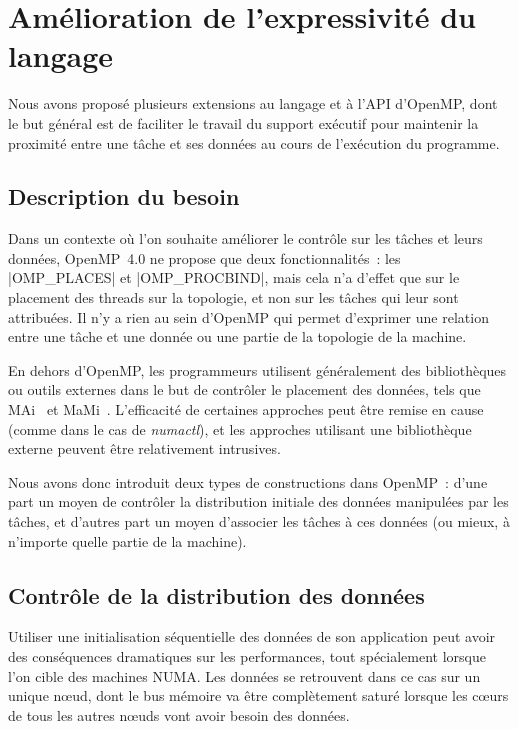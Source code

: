 \section{Amélioration de l'expressivité du langage}\label{sec:openmp:langage}

Nous avons proposé plusieurs extensions au langage et à l'API d'OpenMP, dont le but général est de faciliter le travail du support exécutif pour maintenir la proximité entre une tâche et ses données au cours de l'exécution du programme.

\subsection{Description du besoin}

Dans un contexte où l'on souhaite améliorer le contrôle sur les tâches et leurs données, OpenMP~4.0 ne propose que deux fonctionnalités~: les |OMP_PLACES| et |OMP_PROCBIND|, mais cela n'a d'effet que sur le placement des threads sur la topologie, et non sur les tâches qui leur sont attribuées.
Il n'y a rien au sein d'OpenMP qui permet d'exprimer une relation entre une tâche et une donnée ou une partie de la topologie de la machine.

En dehors d'OpenMP, les programmeurs utilisent généralement des bibliothèques ou outils externes dans le but de contrôler le placement des données, tels que MAi~\cite{Pousa2009} et MaMi~\cite{Broquedis2010a}.
L'efficacité de certaines approches peut être remise en cause (comme dans le cas de \emph{numactl}), et les approches utilisant une bibliothèque externe peuvent être relativement intrusives.

Nous avons donc introduit deux types de constructions dans OpenMP~: d'une part un moyen de contrôler la distribution initiale des données manipulées par les tâches, et d'autres part un moyen d'associer les tâches à ces données (ou mieux, à n'importe quelle partie de la machine).

\subsection{Contrôle de la distribution des données}\label{sec:openmp:langage:init}

Utiliser une initialisation séquentielle des données de son application peut avoir des conséquences dramatiques sur les performances, tout spécialement lorsque l'on cible des machines NUMA.
Les données se retrouvent dans ce cas sur un unique nœud, dont le bus mémoire va être complètement saturé lorsque les cœurs de tous les autres nœuds vont avoir besoin des données.

